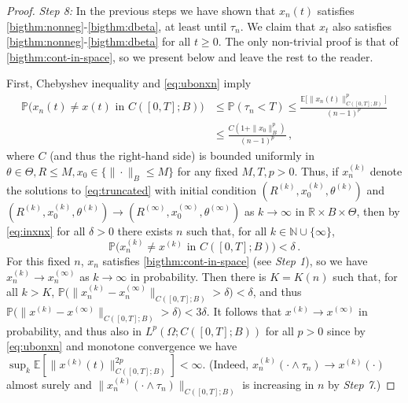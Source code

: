 \documentclass[final]{amsart}
\numberwithin{thm}{section}
\numberwithin{equation}{section}
\newcommand{\E}{\mathbb{E}}
\newcommand{\Prb}{\mathbb{P}}
\newcommand{\N}{\mathbb{N}}
\newcommand{\R}{\mathbb{R}}
\begin{document}
\begin{proof}
    \textit{Step 8:} In the previous steps we have shown that $x_n(t)$ satisfies \ref{bigthm:nonneg}-\ref{bigthm:dbeta}, at least until $\tau_n$. We claim that $x_t$ also satisfies \ref{bigthm:nonneg}-\ref{bigthm:dbeta} for all $t \geq 0$. The only non-trivial proof is that of \ref{bigthm:cont-in-space}, so we present below and leave the rest to the reader.
    
    First,  Chebyshev inequality and \eqref{eq:ubonxn} imply
    \begin{equation}\label{eq:inxnx}
    \begin{aligned}
    \Prb\Big(x_n(t) \neq x(t) \text{ in } C([0,T];B)\Big) &\leq \Prb(\tau_n < T) \leq \frac{\E\Big[\|x_n(t)\|_{C([0,T];B)}^p\Big]}{(n-1)^{p}} \\
    &\leq 
    \frac{C(1+\|x_0\|_B^p)}{(n-1)^{p}} 
    \,,    
    \end{aligned}
    \end{equation}
    where $C$ (and thus the right-hand side) is bounded 
    uniformly in $\theta \in \Theta, R \leq M, x_0 \in \{\|\cdot\|_B \leq M\}$ for any fixed $M,T,p > 0$. Thus, if $x_n^{(k)}$ denote the solutions to \eqref{eq:truncated} with initial condition $(R^{(k)}, x_0^{(k)}, \theta^{(k)})$ and $(R^{(k)}, x_0^{(k)}, \theta^{(k)}) \to (R^{(\infty)},x_0^{(\infty)},\theta^{(\infty)})$ as $k \to \infty$ in $\R\times B \times \Theta$, then by \eqref{eq:inxnx} for all $\delta > 0$ there exists $n$ such that, for all 
    $k \in \N \cup \{\infty\}$, 
    $$
    \Prb\Big(x_n^{(k)} \neq x^{(k)} \text{ in } C([0,T];B)\Big) < \delta \,.
    $$
    For this fixed $n$, $x_n$ satisfies \ref{bigthm:cont-in-space} (see \textit{Step 1}), so we have $x_n^{(k)} \to x_n^{(\infty)}$ as $k \to \infty$ in probability. Then there is $K = K(n)$ such that, for all $k > K$, $\Prb\big(\|x_n^{(k)} - x_n^{(\infty)}\|_{C([0,T];B)} > \delta\big) < \delta$, and thus $\Prb\big(\|x^{(k)} - x^{(\infty)}\|_{C([0,T];B)} > \delta\big) < 3\delta$. It follows that $x^{(k)} \to x^{(\infty)}$ in probability, and thus also in $L^p(\Omega;C([0,T];B))$ for all $p > 0$ since by \eqref{eq:ubonxn} and monotone convergence we have  $\sup_k\E[\|x^{(k)}(t)\|_{C([0,T];B)}^{2p}] < \infty$. (Indeed, $x_n^{(k)}(\cdot \wedge \tau_n) \to x^{(k)}(\cdot)$ almost surely and $\|x_n^{(k)}(\cdot \wedge \tau_n)\|_{C([0,T];B)}$ is increasing in $n$ by \textit{Step 7}.)
    
    
    
    
    
    
    
    
    
\end{proof}
\end{document}
